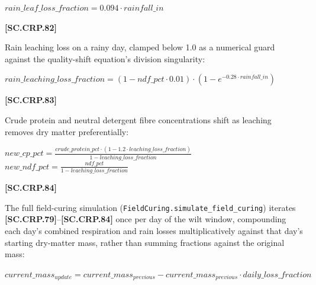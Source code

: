     \begin{center}
        \(rain\_leaf\_loss\_fraction= 0.094 \cdot rainfall\_in\)
    \end{center}
        \vspace{0.5cm}

            {\raggedleft \textbf{[SC.CRP.82]}\par}
            \vspace{0.5cm}

Rain leaching loss on a rainy day, clamped below 1.0 as a numerical guard against the quality-shift equation's division singularity:
   \vspace{0.2cm}

    \begin{center}
        \(rain\_leaching\_loss\_fraction= (1-ndf\_pct \cdot 0.01) \cdot (1-e^{-0.28 \cdot rainfall\_in})\)
    \end{center}
        \vspace{0.5cm}

            {\raggedleft \textbf{[SC.CRP.83]}\par}
            \vspace{0.5cm}

Crude protein and neutral detergent fibre concentrations shift as leaching removes dry matter preferentially:
   \vspace{0.2cm}

    \begin{center}
        \(new\_cp\_pct= \frac{crude\_protein\_pct \cdot (1-1.2 \cdot leaching\_loss\_fraction)}{1-leaching\_loss\_fraction}\)\\
        \(new\_ndf\_pct= \frac{ndf\_pct}{1-leaching\_loss\_fraction}\)
    \end{center}
        \vspace{0.5cm}

            {\raggedleft \textbf{[SC.CRP.84]}\par}
            \vspace{0.5cm}

The full field-curing simulation (\texttt{FieldCuring.simulate\_field\_curing}) iterates \textbf{[SC.CRP.79]}--\textbf{[SC.CRP.84]} once per day of the wilt window, compounding each day's combined respiration and rain losses multiplicatively against that day's starting dry-matter mass, rather than summing fractions against the original mass:
   \vspace{0.2cm}

    \begin{center}
        \(current\_mass_{update}=current\_mass_{previous} - current\_mass_{previous} \cdot daily\_loss\_fraction\)
    \end{center}
        \vspace{0.5cm}


